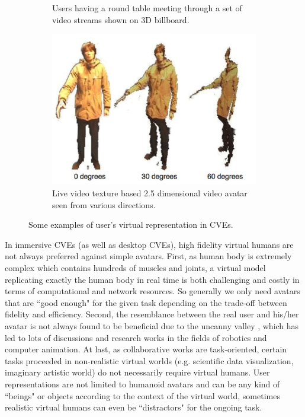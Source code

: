 \begin{figure}[htb]
\begin{subfigure}{.5\textwidth}
    \caption{Users having a round table meeting through a set of video streams shown on 3D billboard.}
    \label{fig:1_vrep:billboard}
  \end{subfigure}
  \begin{subfigure}{.5\textwidth}
    \centering
    \includegraphics[width=0.9\linewidth]{figures/ch1/rep_video_avatar}
    \caption{Live video texture based 2.5 dimensional video avatar seen from various directions.}
    \label{fig:1_vrep:video_avatar}
  \end{subfigure}
  \caption{\label{fig:1_vrep} Some examples of user's virtual representation in CVEs.}
\end{figure}

In immersive CVEs (as well as desktop CVEs), high fidelity virtual humans are not always preferred against simple avatars. First, as human body is extremely complex which contains hundreds of muscles and joints, a virtual model replicating exactly the human body in real time is both challenging and costly in terms of computational and network resources. So generally we only need avatars that are ``good enough" for the given task depending on the trade-off between fidelity and efficiency. Second, the resemblance between the real user and his/her avatar is not always found to be beneficial due to the uncanny valley \citep{Mori1970Uncanny,Mori2012Uncanny}, which has led to lots of discussions and research works in the fields of robotics and computer animation. At last, as collaborative works are task-oriented, certain tasks proceeded in non-realistic virtual worlds (e.g. scientific data visualization, imaginary artistic world) do not necessarily require virtual humans. User representations are not limited to humanoid avatars and can be any kind of ``beings" or objects according to the context of the virtual world, sometimes realistic virtual humans can even be ``distractors" for the ongoing task.

